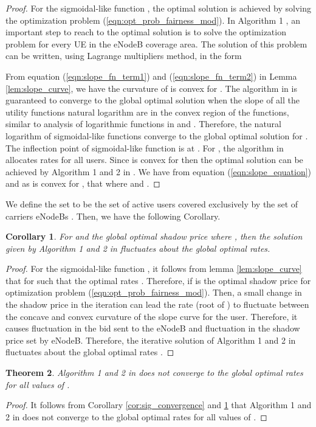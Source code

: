 \documentclass[journal]{IEEEtran} 		\usepackage{amsmath,amssymb}
\newtheorem{thm}{Theorem}[section]
\newtheorem{cor}[thm]{Corollary}
\begin{document}
\begin{proof}
For the sigmoidal-like function , the optimal solution is achieved by solving the optimization problem (\ref{eqn:opt_prob_fairness_mod}). In Algorithm 1 \cite{Ahmed_Utility4}, an important step to reach to the optimal solution is to solve the optimization problem  for every UE in the  eNodeB coverage area. The solution of this problem can be written, using Lagrange multipliers method, in the form

From equation (\ref{eqn:slope_fn_term1}) and (\ref{eqn:slope_fn_term2}) in Lemma \ref{lem:slope_curve}, we have the curvature of  is convex for . The algorithm in \cite{Ahmed_Utility4} is guaranteed to converge to the global optimal solution when the slope  of all the utility functions natural logarithm  are in the convex region of the functions, similar to analysis of logarithmic functions in \cite{kelly98ratecontrol} and \cite{Low99optimizationflow}. Therefore, the natural logarithm of sigmoidal-like functions  converge to the global optimal solution for . The inflection point of sigmoidal-like function  is at . For , the algorithm in \cite{Ahmed_Utility4} allocates rates  for all users.
Since  is convex for  then the optimal solution can be achieved by Algorithm 1 and 2 in \cite{Ahmed_Utility4}. We have from equation (\ref{eqn:slope_equation}) and as  is convex for , that  where  and .
\end{proof}
We define the set  to be the set of active users covered exclusively by the set of carriers eNodeBs . Then, we have the following Corollary.
\begin{cor}\label{cor:sig_fluctuate}
For  and the global optimal shadow price  where , then the solution given by Algorithm 1 and 2 in \cite{Ahmed_Utility4} fluctuates about the global optimal rates.
\end{cor}
\begin{proof}
For the sigmoidal-like function , it follows from lemma \ref{lem:slope_curve} that for     such that the optimal rates . Therefore, if  is the optimal shadow price for optimization problem (\ref{eqn:opt_prob_fairness_mod}). Then, a small change in the shadow price  in the  iteration can lead the rate  (root of ) to fluctuate between the concave and convex curvature of the slope curve  for the  user. Therefore, it causes fluctuation in the bid  sent to the eNodeB and fluctuation in the shadow price  set by eNodeB.
Therefore, the iterative solution of Algorithm 1 and 2 in \cite{Ahmed_Utility4} fluctuates about the global optimal rates .
\end{proof}
\begin{thm}\label{thm:sig_not_conv}
Algorithm 1 and 2 in \cite{Ahmed_Utility4} does not converge to the global optimal rates for all values of .
\end{thm}
\begin{proof}
It follows from Corollary \ref{cor:sig_convergence} and \ref{cor:sig_fluctuate} that Algorithm 1 and 2 in \cite{Ahmed_Utility4} does not converge to the global optimal rates for all values of .
\end{proof}
\end{document}
